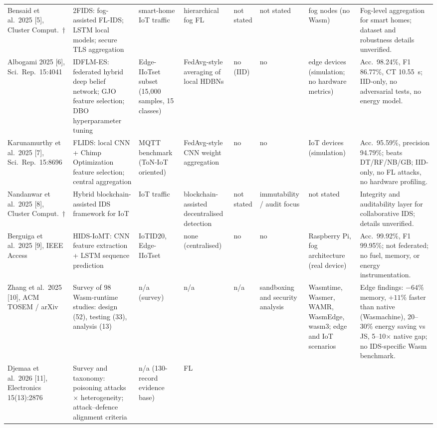 \documentclass[11pt,a4paper]{article}
\begin{document}
\begin{landscape}
\begin{longtable}{L{2.9cm}L{3.1cm}L{2.4cm}L{2.6cm}L{1.3cm}L{2.1cm}L{2.7cm}L{4.4cm}}
\addlinespace[2pt]
Bensaid et al.\ 2025 [5], Cluster Comput.\ $\dagger$ &
2FIDS: fog-assisted FL-IDS; LSTM local models; secure TLS aggregation &
smart-home IoT traffic & hierarchical fog FL & not stated & not stated &
fog nodes (no Wasm) & Fog-level aggregation for smart homes; dataset and
robustness details unverified. \\
\addlinespace[2pt]
Albogami 2025 [6], Sci.\ Rep.\ 15:4041 &
IDFLM-ES: federated hybrid deep belief network; GJO feature selection; DBO
hyperparameter tuning & Edge-IIoTset subset (15{,}000 samples, 15 classes) &
FedAvg-style averaging of local HDBNs & no (IID) & no & edge devices
(simulation; no hardware metrics) & Acc.\ 98.24\%, F1 86.77\%, CT 10.55~s;
IID-only, no adversarial tests, no energy model. \\
\addlinespace[2pt]
Karunamurthy et al.\ 2025 [7], Sci.\ Rep.\ 15:8696 &
FLIDS: local CNN + Chimp Optimization feature selection; central
aggregation & MQTT benchmark (ToN-IoT oriented) & FedAvg-style CNN weight
aggregation & no & no & IoT devices (simulation) & Acc.\ 95.59\%, precision
94.79\%; beats DT/RF/NB/GB; IID-only, no FL attacks, no hardware
profiling. \\
\addlinespace[2pt]
Nandanwar et al.\ 2025 [8], Cluster Comput.\ $\dagger$ &
Hybrid blockchain-assisted IDS framework for IoT & IoT traffic &
blockchain-assisted decentralised detection & not stated & immutability /
audit focus & not stated & Integrity and auditability layer for
collaborative IDS; details unverified. \\
\addlinespace[2pt]
Berguiga et al.\ 2025 [9], IEEE Access &
HIDS-IoMT: CNN feature extraction + LSTM sequence prediction & IoTID20,
Edge-IIoTset & none (centralised) & no & no & Raspberry Pi, fog
architecture (real device) & Acc.\ 99.92\%, F1 99.95\%; not federated; no
fuel, memory, or energy instrumentation. \\
\addlinespace[2pt]
Zhang et al.\ 2025 [10], ACM TOSEM / arXiv &
Survey of 98 Wasm-runtime studies: design (52), testing (33), analysis
(13) & n/a (survey) & n/a & n/a & sandboxing and security analysis &
Wasmtime, Wasmer, WAMR, WasmEdge, wasm3; edge and IoT scenarios & Edge
findings: $-64\%$ memory, $+11\%$ faster than native (Wasmachine), 20--30\%
energy saving vs JS, 5--10$\times$ native gap; no IDS-specific Wasm
benchmark. \\
\addlinespace[2pt]
Djemaa et al.\ 2026 [11], Electronics 15(13):2876 &
Survey and taxonomy: poisoning attacks $\times$ heterogeneity;
attack--defence alignment criteria & n/a (130-record evidence base) & FL

\end{longtable}
\end{landscape}
\end{document}
